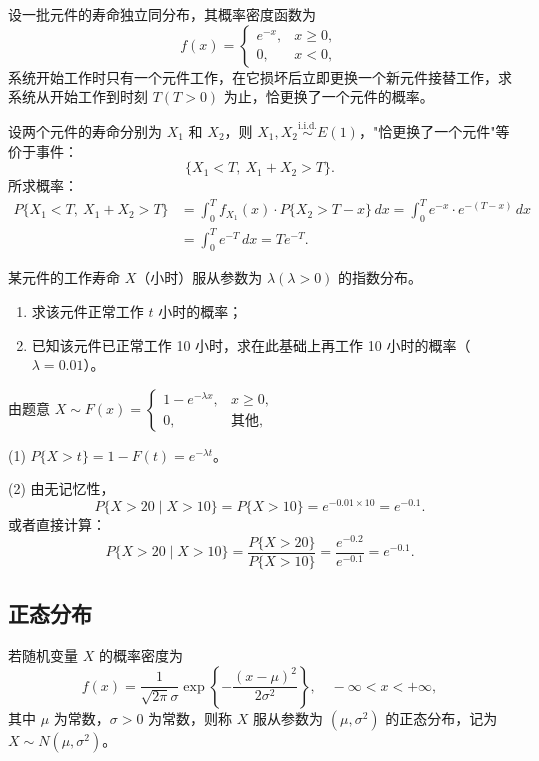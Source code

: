 ﻿\documentclass[lang=cn,11pt]{elegantbook}
\begin{document}
\begin{exercise}[指数分布与系统更换]
设一批元件的寿命独立同分布，其概率密度函数为
\[
f(x)=
\begin{cases}
e^{-x}, & x\geqslant0, \\[4pt]
0, & x<0,
\end{cases}
\]
系统开始工作时只有一个元件工作，在它损坏后立即更换一个新元件接替工作，求系统从开始工作到时刻 $T(T>0)$ 为止，恰更换了一个元件的概率。
\end{exercise}
\begin{solution}
设两个元件的寿命分别为 $X_1$ 和 $X_2$，则 $X_1, X_2 \stackrel{\text{i.i.d.}}{\sim} E(1)$，"恰更换了一个元件"等价于事件：
\[
\{X_1 < T,\ X_1+X_2 > T\}.
\]
所求概率：
\[
\begin{aligned}
P\{X_1 < T,\ X_1+X_2 > T\} &= \int_0^T f_{X_1}(x)\cdot P\{X_2 > T-x\}\,dx = \int_0^T e^{-x}\cdot e^{-(T-x)}\,dx \\
&= \int_0^T e^{-T}\,dx = Te^{-T}.
\end{aligned}
\]
\end{solution}



\begin{exercise}\label{exer:2-15}
某元件的工作寿命 $X$（小时）服从参数为 $\lambda(\lambda>0)$ 的指数分布。
\begin{enumerate}
    \item[(1)] 求该元件正常工作 $t$ 小时的概率；
    \item[(2)] 已知该元件已正常工作 10 小时，求在此基础上再工作 10 小时的概率（$\lambda=0.01$）。
\end{enumerate}
\end{exercise}
\begin{solution}
由题意 $X \sim F(x) = \begin{cases} 1 - e^{-\lambda x}, & x \ge 0, \\ 0, & \text{其他}, \end{cases}$

(1) $P\{X>t\} = 1 - F(t) = e^{-\lambda t}$。

(2) 由无记忆性，
\[
P\{X>20 \mid X>10\} = P\{X>10\} = e^{-0.01 \times 10} = e^{-0.1}.
\]
或者直接计算：
\[
P\{X>20 \mid X>10\} = \frac{P\{X>20\}}{P\{X>10\}} = \frac{e^{-0.2}}{e^{-0.1}} = e^{-0.1}.
\]
\end{solution}

\subsection{正态分布} \label{subsec:normal-dist}
\begin{definition}[正态分布]\label{def:normal-dist}
若随机变量 $X$ 的概率密度为
\[
f(x) = \frac{1}{\sqrt{2\pi}\sigma} \exp\left\{-\frac{(x-\mu)^2}{2\sigma^2}\right\},\quad -\infty < x < +\infty,
\]
其中 $\mu$ 为常数，$\sigma > 0$ 为常数，则称 $X$ 服从参数为 $(\mu,\sigma^2)$ 的正态分布，记为 $X \sim N(\mu,\sigma^2)$。
\end{definition}
\end{document}

